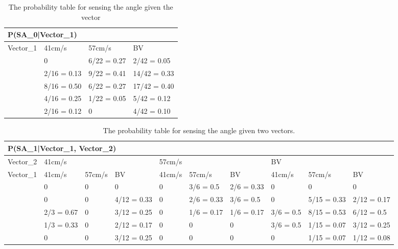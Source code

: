 \begin{center}
\begin{table}[H]
\centering
\begin{tabular}{|l|l|l|l|}
\hline
\multicolumn{4}{|l|}{P(SA\_0|Vector\_1)} \\ \hline
Vector\_1     & 41cm/s & 57cm/s & BV \\\hline
[-30 - 0]   & 0           & 6/22 = 0.27  & 2/42 = 0.05  \\ \hline
[0 - 30]    & 2/16 = 0.13 & 9/22 = 0.41  & 14/42 = 0.33 \\ \hline
[30 - 60]   & 8/16 = 0.50 & 6/22 = 0.27  & 17/42 = 0.40 \\ \hline
[60 - 90]   & 4/16 = 0.25 & 1/22 = 0.05  & 5/42 = 0.12  \\ \hline
[90- 330]   & 2/16 = 0.12 & 0            & 4/42 = 0.10   \\ \hline
\end{tabular}
\label{SAtable}
\caption{The probability table for sensing the angle given the vector}
\end{table}
\end{center}

\begin{table}[H]
\centering
\begin{tabular}{|l|p{1.2cm}|p{1.2cm}|p{1.2cm}|p{1.2cm}|p{1.2cm}|p{1.2cm}|p{1.2cm}|p{1.2cm}|p{1.2cm}|}
\hline
\multicolumn{10}{|l|}{P(SA\_1|Vector\_1, Vector\_2)} \\\hline
Vector\_2 & \multicolumn{3}{l|}{41cm/s} & \multicolumn{3}{l|}{57cm/s} &
\multicolumn{3}{l|}{BV}\\\hline
Vector\_1 & 41cm/s & 57cm/s & BV & 41cm/s & 57cm/s & BV & 41cm/s & 57cm/s & BV
\\\hline
[-30 - 0] & 0  & 0 & 0 & 0 & 3/6 = 0.5 & 2/6 = 0.33 &
0 & 0 & 0 \\ \hline
[0 - 30] & 0 & 0 & 4/12 = 0.33 & 0 & 2/6 = 0.33 & 3/6 = 0.5 & 0 & 5/15 =
0.33 & 2/12 = 0.17 \\ \hline 
[30 - 60] & 2/3 = 0.67 & 0 & 3/12 = 0.25 & 0 & 1/6 = 0.17 & 1/6 = 0.17
& 3/6 = 0.5 & 8/15 = 0.53 & 6/12 = 0.5 \\ \hline 
[60 - 90] & 1/3 = 0.33 & 0 & 2/12 = 0.17 & 0 & 0 & 0 & 3/6 = 0.5 & 1/15 = 0.07 &
3/12 = 0.25 \\ \hline 
[90 - 330] & 0 & 0 & 3/12 = 0.25 & 0 & 0 & 0 & 0 & 1/15 = 0.07 & 1/12 = 0.08\\
\hline
\end{tabular}
\caption{The probability table for sensing the angle given two vectors.}
\label{SDtable2}
\end{table}

